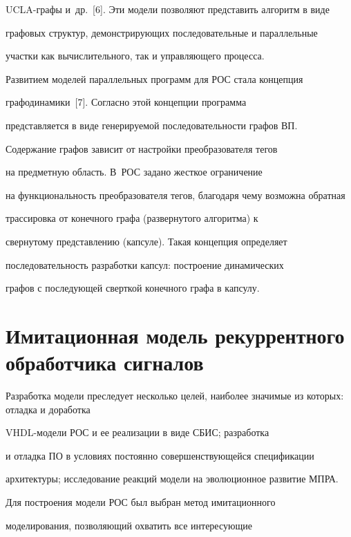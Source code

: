 UCLA-гра\-фы и~др.~[6]. Эти модели позволяют  представить алгоритм в виде 


графовых структур, демонстрирующих последовательные и параллельные 


участки как вычислительного, так и управляющего процесса.


   


   Развитием моделей  параллельных программ для РОС  стала концепция 


графодинамики~[7]. Согласно этой концепции программа 


представляется в виде генерируемой  последовательности графов ВП. 


Содержание графов зависит от настройки преобразователя тегов 


 на предметную область. В~РОС задано жесткое ограничение 


на функциональность преобразователя тегов, благодаря  чему возможна обратная 


трассировка от конечного графа (развернутого алгоритма) к 


свернутому представлению (кап\-су\-ле). Такая концепция определяет 


последовательность разработки кап\-сул: построение динамических 


графов с последующей сверткой  конечного графа в капсулу.





\section{Имитационная модель  рекуррентного обработчика сигналов}


   


   Разработка модели преследует  несколько целей, наиболее значимые  из которых: отладка и доработка 


VHDL-мо\-де\-ли РОС и ее реализации в виде СБИС; разработка 


и отладка ПО в условиях постоянно  совершенствующейся спецификации 


архитектуры; исследование реакций модели на эволюционное развитие  МПРА.


   


   Для построения модели РОС был выбран метод имитационного 


моделирования, позволяющий охватить все интересующие 


